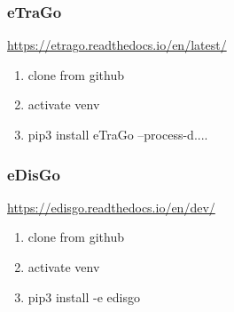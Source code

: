 \documentclass[
a4paper,     %
12pt         %
]{scrartcl}  %
\begin{document}
\subsubsection{eTraGo}
\url{https://etrago.readthedocs.io/en/latest/}
\begin{enumerate}
	\item clone from github
	\item activate venv
	\item pip3 install eTraGo --process-d....
\end{enumerate}


\subsubsection{eDisGo}
\url{https://edisgo.readthedocs.io/en/dev/}
\begin{enumerate}
	\item clone from github
	\item activate venv
	\item pip3 install -e edisgo
\end{enumerate}


%
	
\end{document}
